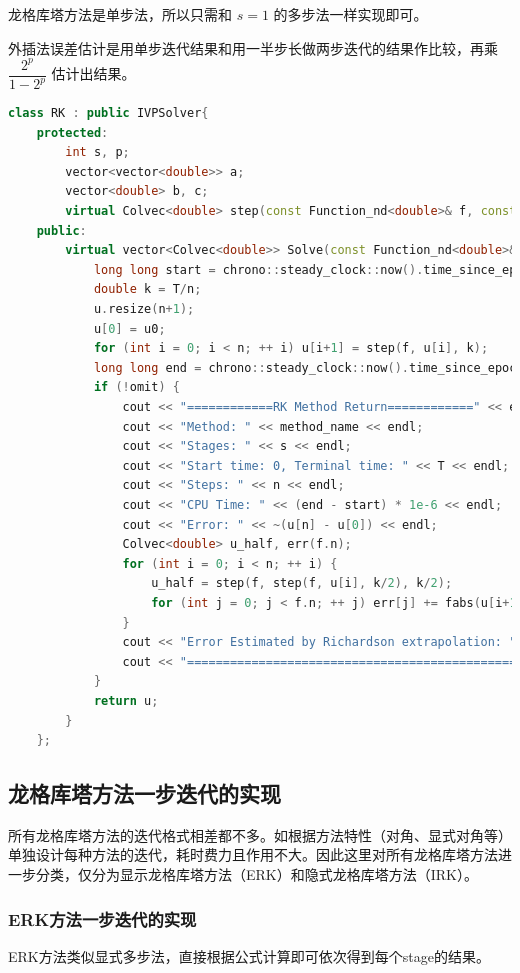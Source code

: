 \documentclass{ctexart}
\begin{document}
龙格库塔方法是单步法，所以只需和 $s=1$ 的多步法一样实现即可。

外插法误差估计是用单步迭代结果和用一半步长做两步迭代的结果作比较，再乘 $\dfrac {2^p}{1-2^p}$ 估计出结果。

\begin{lstlisting}[language=c++]
class RK : public IVPSolver{
	protected:
		int s, p;
		vector<vector<double>> a;
		vector<double> b, c;
		virtual Colvec<double> step(const Function_nd<double>& f, const Colvec<double>& u, double k) = 0;
	public:
		virtual vector<Colvec<double>> Solve(const Function_nd<double>& f, const Colvec<double>& u0, double T, int n, int s = 0, bool omit = 0) {
			long long start = chrono::steady_clock::now().time_since_epoch().count();
			double k = T/n;
			u.resize(n+1);
			u[0] = u0;
			for (int i = 0; i < n; ++ i) u[i+1] = step(f, u[i], k);
			long long end = chrono::steady_clock::now().time_since_epoch().count();
			if (!omit) {
				cout << "============RK Method Return============" << endl;
				cout << "Method: " << method_name << endl;
				cout << "Stages: " << s << endl;
				cout << "Start time: 0, Terminal time: " << T << endl;
				cout << "Steps: " << n << endl;
				cout << "CPU Time: " << (end - start) * 1e-6 << endl;
				cout << "Error: " << ~(u[n] - u[0]) << endl;
				Colvec<double> u_half, err(f.n);
				for (int i = 0; i < n; ++ i) {
					u_half = step(f, step(f, u[i], k/2), k/2);
					for (int j = 0; j < f.n; ++ j) err[j] += fabs(u[i+1][j] - u_half[j]) * (1<<p) / ((1<<p)-1);
				}
				cout << "Error Estimated by Richardson extrapolation: " << ~err << endl;
				cout << "=================================================" << endl;
			}
			return u;
		}
	};	
\end{lstlisting}

\subsection{龙格库塔方法一步迭代的实现}

所有龙格库塔方法的迭代格式相差都不多。如根据方法特性（对角、显式对角等）单独设计每种方法的迭代，耗时费力且作用不大。因此这里对所有龙格库塔方法进一步分类，仅分为显示龙格库塔方法（ERK）和隐式龙格库塔方法（IRK）。

\subsubsection{ERK方法一步迭代的实现}

ERK方法类似显式多步法，直接根据公式计算即可依次得到每个stage的结果。
\end{document}
